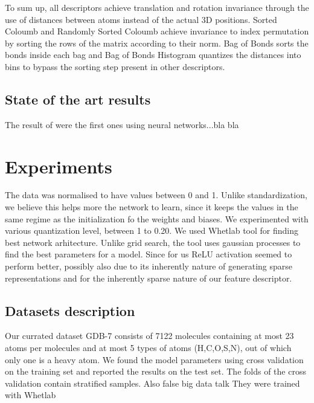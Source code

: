 \documentclass{article}
\begin{document}
To sum up, all descriptors achieve translation and rotation invariance through the use of
distances between atoms instead of the actual 3D positions. Sorted Coloumb and Randomly Sorted Coloumb achieve invariance to index permutation by sorting the rows of the matrix according to their norm. Bag of Bonds sorts the bonds inside each bag and Bag of Bonds Histogram quantizes the distances into bins to bypass the sorting step present in other descriptors.



\subsection{State of the art results}
The result of \cite{montavon2012learning} were the first ones using neural networks...bla bla


\section{Experiments}
The data was normalised to have values between 0 and 1. Unlike standardization,
we believe this helps more the network to learn, since it keeps the values in the same regime as the initialization fo the weights and biases.
We experimented with various quantization level, between 1 to 0.20.
We used Whetlab tool for finding best network arhitecture. Unlike grid search, the tool uses gaussian processes to find the best parameters for a model.
Since for us ReLU activation seemed to perform better, possibly also due to its inherently nature of generating sparse representations and for the inherently sparse nature of our feature descriptor.

\subsection{Datasets description}
Our currated dataset GDB-7 consists of 7122 molecules containing at most 23 atoms per molecules and at most 5 types of atoms (H,C,O,S,N), out of which only one is a heavy atom. We found the model parameters using cross validation on the training set and reported the results on the test set. The folds of the cross validation contain stratified samples.
Also false big data talk \cite{falsebigdata}
They were trained with Whetlab \cite{whetlab}
\end{document}
